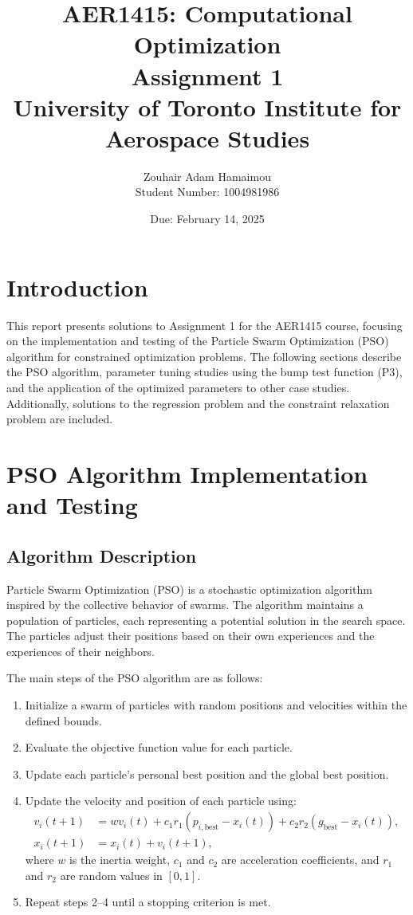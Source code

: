 \documentclass[12pt]{article}
\title{AER1415: Computational Optimization\\Assignment 1\\\vspace{0.4cm}\large \textbf{University of Toronto Institute for Aerospace Studies}}
\author{Zouhair Adam Hamaimou\\Student Number: 1004981986}
\date{Due: February 14, 2025}
\begin{document}
\maketitle

\tableofcontents
\newpage

\section{Introduction}
This report presents solutions to Assignment 1 for the AER1415 course, focusing on the implementation and testing of the Particle Swarm Optimization (PSO) algorithm for constrained optimization problems. The following sections describe the PSO algorithm, parameter tuning studies using the bump test function (P3), and the application of the optimized parameters to other case studies. Additionally, solutions to the regression problem and the constraint relaxation problem are included.

\section{PSO Algorithm Implementation and Testing}

\subsection{Algorithm Description}
Particle Swarm Optimization (PSO) is a stochastic optimization algorithm inspired by the collective behavior of swarms. The algorithm maintains a population of particles, each representing a potential solution in the search space. The particles adjust their positions based on their own experiences and the experiences of their neighbors.

The main steps of the PSO algorithm are as follows:
\begin{enumerate}
    \item Initialize a swarm of particles with random positions and velocities within the defined bounds.
    \item Evaluate the objective function value for each particle.
    \item Update each particle's personal best position and the global best position.
    \item Update the velocity and position of each particle using:
    \begin{align*}
        v_{i}(t+1) &= w v_{i}(t) + c_1 r_1 (p_{i,\text{best}} - x_{i}(t)) + c_2 r_2 (g_{\text{best}} - x_{i}(t)), \\
        x_{i}(t+1) &= x_{i}(t) + v_{i}(t+1),
    \end{align*}
    where $w$ is the inertia weight, $c_1$ and $c_2$ are acceleration coefficients, and $r_1$ and $r_2$ are random values in $[0,1]$.
    \item Repeat steps 2--4 until a stopping criterion is met.
\end{enumerate}
\end{document}
